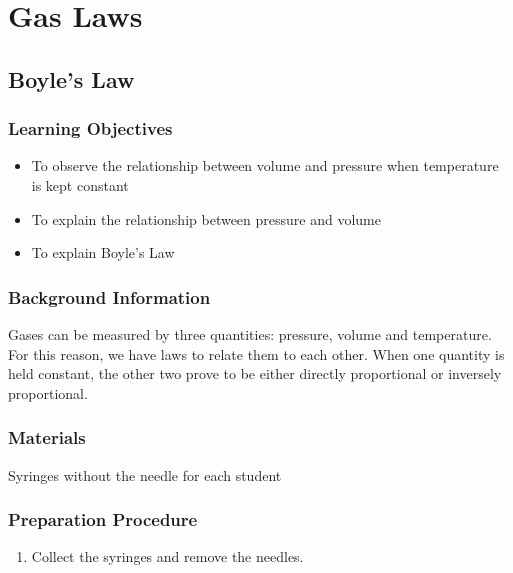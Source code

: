 \section{Gas Laws}

\subsection{Boyle's Law}

\subsubsection*{Learning Objectives}
\begin{itemize}
\item{To observe the relationship between volume and pressure when temperature is kept constant} 
\item{To explain the relationship between pressure and volume} 
\item{To explain Boyle's Law} 
\end{itemize}

\subsubsection*{Background Information}
Gases can be measured by three quantities: pressure, volume and temperature. For this reason, we have laws to relate them to each other. When one quantity is held constant, the other two prove to be either directly proportional or inversely proportional.  

\subsubsection*{Materials}
Syringes without the needle for each student

\subsubsection*{Preparation Procedure}
\begin{enumerate}
\item{Collect the syringes and remove the needles.} 
\end{enumerate}

